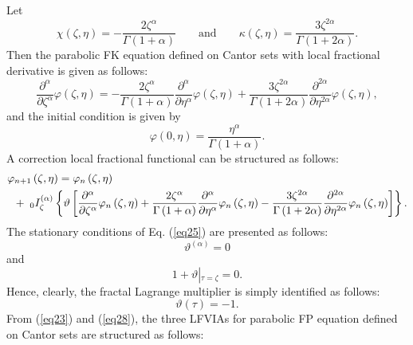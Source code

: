 \documentclass[10pt]{NSP1}
\begin{document}
Let $$\chi \left( {\zeta ,\eta } \right)=-\frac{2\zeta ^\alpha }{\Gamma
\left( {1+\alpha } \right)}\qquad \text{and} \qquad \kappa \left( {\zeta ,\eta }
\right)=\frac{3\zeta ^{2\alpha }}{\Gamma \left( {1+2\alpha } \right)}.$$ Then
the parabolic FK equation defined on Cantor sets with local fractional
derivative is given as follows:
\begin{equation}
\label{eq23}
\frac{\partial ^\alpha }{\partial \zeta ^\alpha }\varphi \left( {\zeta ,\eta
} \right)=-\frac{2\zeta ^\alpha }{\Gamma \left( {1+\alpha }
\right)}\frac{\partial ^\alpha }{\partial \eta ^\alpha }\varphi \left(
{\zeta ,\eta } \right)+\frac{3\zeta ^{2\alpha }}{\Gamma \left( {1+2\alpha }
\right)}\frac{\partial ^{2\alpha }}{\partial \eta ^{2\alpha }}\varphi \left(
{\zeta ,\eta } \right),
\end{equation}
and the initial condition is given by
\begin{equation}
\label{eq24}
\varphi \left( {0,\eta } \right)=\frac{\eta ^\alpha }{\Gamma \left(
{1+\alpha } \right)}.
\end{equation}
A correction local fractional functional can be structured as follows:
\begin{align}
\label{eq25}
&\varphi _{n+1} \left( {\zeta ,\eta } \right)
=\varphi _n \left( {\zeta ,\eta } \right)\notag \\
&\;\; + \; _0I_\zeta ^{\left( \alpha \right)}\left\{ {\vartheta \left[
{\frac{\partial ^\alpha }{\partial \zeta ^\alpha }\varphi _n \left( {\zeta
,\eta } \right)+\frac{2\zeta ^\alpha }{\Gamma \left( {1+\alpha }
\right)}\frac{\partial ^\alpha }{\partial \eta ^\alpha }\varphi _n \left(
{\zeta ,\eta } \right)-\frac{3\zeta ^{2\alpha }}{\Gamma \left( {1+2\alpha }
\right)}\frac{\partial ^{2\alpha }}{\partial \eta ^{2\alpha }}\varphi _n
\left( {\zeta ,\eta } \right)} \right]} \right\}.
\end{align}
The stationary conditions of Eq. (\ref{eq25}) are presented as follows:
\begin{equation}
\label{eq26}
\vartheta ^{\left( \alpha \right)}=0
\end{equation}
and
\begin{equation}
\label{eq27}
1+\vartheta \left| {_{\tau =\zeta } } \right.=0.
\end{equation}
Hence, clearly, the fractal Lagrange multiplier is simply identified as follows:
\begin{equation}
\label{eq28}
\vartheta \left( \tau \right)=-1.
\end{equation}
From (\ref{eq23}) and (\ref{eq28}), the three LFVIAs for parabolic FP equation
defined on Cantor sets are structured as follows:\\
\end{document}
